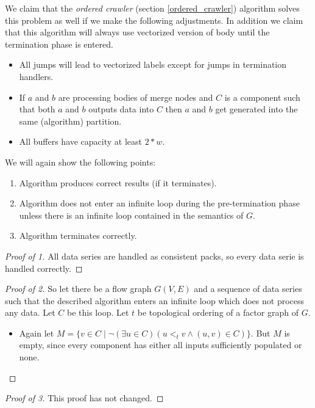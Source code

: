 \begin{claim}
We claim that the \emph{ordered crawler} (section \ref{ordered_crawler}) algorithm solves this problem as well if we make the following adjustments. In addition we claim that this algorithm will always use vectorized version of body until the termination phase is entered.
 \begin{itemize}
   \item All jumps will lead to vectorized labels except for jumps in termination handlers.
   \item If $a$ and $b$ are processing bodies of merge nodes and $C$ is a component such that both $a$ and $b$ outputs data into $C$ then $a$ and $b$ get generated into the same (algorithm) partition.
   \item All buffers have capacity at least $2*w$.
 \end{itemize}
We will again show the following points:
\begin{enumerate}
  \item Algorithm produces correct results (if it terminates).
  \item Algorithm does not enter an infinite loop during the pre-termination phase unless there is an infinite loop contained in the semantics of $G$.
  \item Algorithm terminates correctly.
\end{enumerate}
\begin{proof}[Proof of 1]
  All data series are handled as consistent packs, so every data serie is handled correctly.
\end{proof}
\begin{proof}[Proof of 2] So let there be a flow graph $G(V,E)$ and a sequence of data series such that the described algorithm enters an infinite loop which does not process any data. Let $C$ be this loop. Let $t$ be topological ordering of a factor graph of $G$. 
  \begin{itemize}
    \item Again let $M = \{v \in C \mid \neg (\exists u \in C)( u <_t v \wedge (u,v) \in C)\}$. But $M$ is empty, since every component has either all inputs sufficiently populated or none.
  \end{itemize}
\end{proof}
\begin{proof}[Proof of 3]
This proof has not changed.
\end{proof}
\end{claim}

